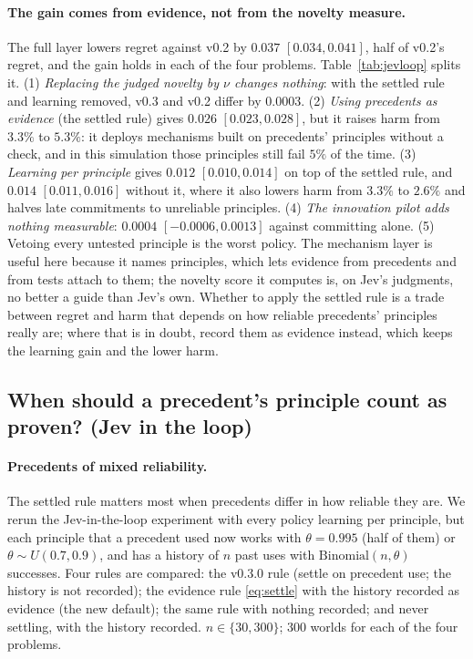 \documentclass[11pt]{article}
\theoremstyle{definition}
\begin{document}
\paragraph{The gain comes from evidence, not from the novelty measure.} The full layer lowers regret
against v0.2 by $0.037$ $[0.034,0.041]$, half of v0.2's regret, and the gain holds in each of the four
problems. Table~\ref{tab:jevloop} splits it. (1) \emph{Replacing the judged novelty by $\nu$ changes
nothing}: with the settled rule and learning removed, v0.3 and v0.2 differ by $0.0003$. (2) \emph{Using
precedents as evidence} (the settled rule) gives $0.026$ $[0.023,0.028]$, but it raises harm from
$3.3\%$ to $5.3\%$: it deploys mechanisms built on precedents' principles without a check, and in this
simulation those principles still fail $5\%$ of the time. (3) \emph{Learning per principle} gives
$0.012$ $[0.010,0.014]$ on top of the settled rule, and $0.014$ $[0.011,0.016]$ without it, where it
also lowers harm from $3.3\%$ to $2.6\%$ and halves late commitments to unreliable principles. (4)
\emph{The innovation pilot adds nothing measurable}: $0.0004$ $[-0.0006,0.0013]$ against committing
alone. (5) Vetoing every untested principle is the worst policy. The mechanism layer is useful here
because it names principles, which lets evidence from precedents and from tests attach to them; the
novelty score it computes is, on Jev's judgments, no better a guide than Jev's own. Whether to apply
the settled rule is a trade between regret and harm that depends on how reliable precedents' principles
really are; where that is in doubt, record them as evidence instead, which keeps the learning gain
and the lower harm.


\subsection{When should a precedent's principle count as proven? (Jev in the loop)}\label{sec:settle}

\paragraph{Precedents of mixed reliability.} The settled rule matters most when precedents differ
in how reliable they are. We rerun the Jev-in-the-loop experiment with every policy learning per
principle, but each principle that a precedent used now works with $\theta=0.995$ (half of them) or
$\theta\sim U(0.7,0.9)$, and has a history of $n$ past uses with $\mathrm{Binomial}(n,\theta)$
successes. Four rules are compared: the v0.3.0 rule (settle on precedent use; the history is not
recorded); the evidence rule \eqref{eq:settle} with the history recorded as evidence (the new
default); the same rule with nothing recorded; and never settling, with the history recorded.
$n\in\{30,300\}$; 300 worlds for each of the four problems.
\end{document}
